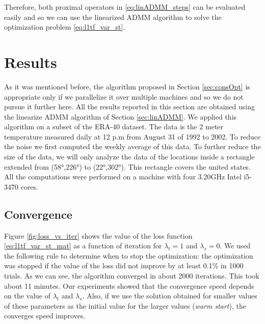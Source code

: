 \documentclass[review]{elsarticle}
\begin{document}
Therefore, both proximal operators in \ref{eq:linADMM_steps} can be evaluated easily and so we can use the linearized ADMM algorithm to solve the optimization problem \ref{eq:l1tf_var_st}.

\section{Results}
As it was mentioned before, the algorithm proposed in Section \ref{sec:consOpt} is appropriate only if we parallelize it over multiple machines and so we do not pursue it further here. All the results reported in this section are obtained using the linearize ADMM algorithm of Section \ref{sec:linADMM}. We applied this algorithm on a subset of the ERA-40 dataset. The data is the 2 meter temperature measured daily at 12 p.m from August 31 of 1992 to 2002. To reduce the noise we first computed the weekly average of this data. To further reduce the size of the data, we will only analyze the data of the locations inside a rectangle extended from (\ang{58},\ang{226}) to (\ang{22},\ang{302}). This rectangle covers the united states. All the computations were performed on a machine with four 3.20GHz Intel i5-3470 cores.

\subsection{Convergence}

Figure \ref{fig:loss_vs_iter} shows the value of the loss function \ref{eq:l1tf_var_st_mat} as a function of iteration for $\lambda_t=1$ and $\lambda_s=0$. We used the following rule to determine when to stop the optimization: the optimization was stopped if the value of the loss did not improve by at least 0.1\% in 1000 trials. As we can see, the algorithm converged in about 2000 iterations. This took about 11 minutes. Our experiments showed that the convergence speed depends on the value of $\lambda_t$ and $\lambda_s$. Also, if we use the solution obtained for smaller values of these parameters as the initial value for the larger values (\textit{warm start}), the converges speed improves.
\end{document}
